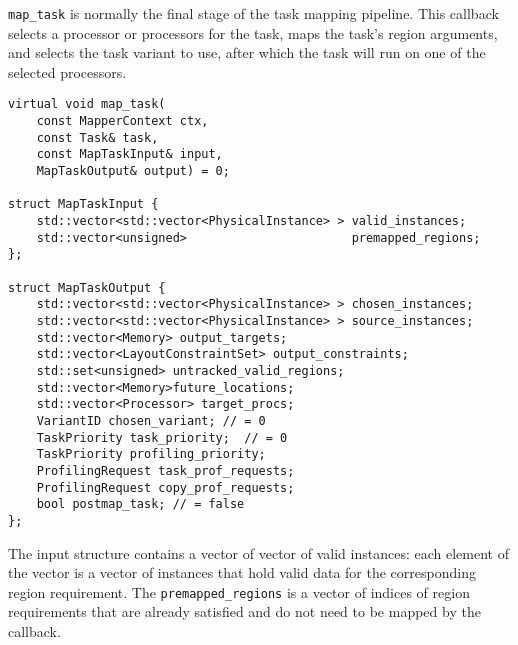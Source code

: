 {\tt map\_task} is normally the final stage of the task mapping pipeline.  This callback selects a processor or processors for the task, maps the task's region arguments, and selects the task variant to use, after which the task will run on one of the selected processors.
\begin{lstlisting}
virtual void map_task(
    const MapperContext ctx,
    const Task& task,
    const MapTaskInput& input,
    MapTaskOutput& output) = 0;

struct MapTaskInput {
    std::vector<std::vector<PhysicalInstance> > valid_instances;
    std::vector<unsigned>                       premapped_regions;
};

struct MapTaskOutput {
    std::vector<std::vector<PhysicalInstance> > chosen_instances; 
    std::vector<std::vector<PhysicalInstance> > source_instances;
    std::vector<Memory> output_targets;
    std::vector<LayoutConstraintSet> output_constraints;
    std::set<unsigned> untracked_valid_regions;
    std::vector<Memory>future_locations;
    std::vector<Processor> target_procs;
    VariantID chosen_variant; // = 0 
    TaskPriority task_priority;  // = 0
    TaskPriority profiling_priority;
    ProfilingRequest task_prof_requests;
    ProfilingRequest copy_prof_requests;
    bool postmap_task; // = false
};
\end{lstlisting}
The input structure contains a vector of vector of valid instances: each element of the vector is a vector of instances that
hold valid data for the corresponding region requirement.  The {\tt premapped\_regions} is a vector of indices of region
requirements that are already satisfied and do not need to be mapped by the callback.

